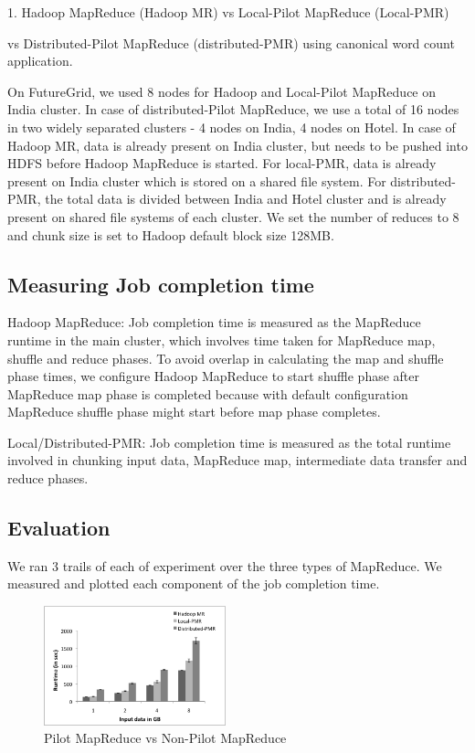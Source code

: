 \documentclass{acm_proc_article-sp}
\begin{document}
1. Hadoop MapReduce (Hadoop MR) vs  Local-Pilot MapReduce (Local-PMR) 

vs Distributed-Pilot MapReduce (distributed-PMR) using canonical word count application.


On FutureGrid, we used 8 nodes for Hadoop and Local-Pilot MapReduce on India cluster. In case of distributed-Pilot MapReduce, we use a total of 16 nodes in two widely separated clusters - 4 nodes on India, 4 nodes on Hotel. In case of Hadoop MR, data is already present on India cluster, but needs to be pushed into HDFS before Hadoop MapReduce is started. For local-PMR, data is already present on India cluster which is stored on a shared file system. For distributed-PMR, the total data is divided between India and Hotel cluster and is already present on shared file systems of each cluster. We set the number of reduces to 8 and chunk size is set to Hadoop default block size 128MB.

\subsection{Measuring Job completion time}
Hadoop MapReduce: Job completion time is measured as the MapReduce runtime in the main cluster, which involves time taken for MapReduce map, shuffle and reduce phases. To avoid overlap in calculating the map and shuffle phase times, we configure Hadoop MapReduce to start shuffle phase after MapReduce map phase is completed because with default configuration MapReduce shuffle phase might start before map phase completes. 

Local/Distributed-PMR: Job completion time is measured as the total runtime involved in chunking input data, MapReduce map, intermediate data transfer and reduce phases.

\subsection{Evaluation}
We ran 3 trails of each of experiment over the three types of MapReduce. We measured and plotted each component of the job completion time.

\begin{figure}[compMR]
	\centering
		\includegraphics[width=0.47\textwidth]{figures/HMRvsL-PMRvsD-PMR.png}
	\caption{Pilot MapReduce vs Non-Pilot MapReduce}
	\label{fig:figures_compMR}
\end{figure}
\end{document}
